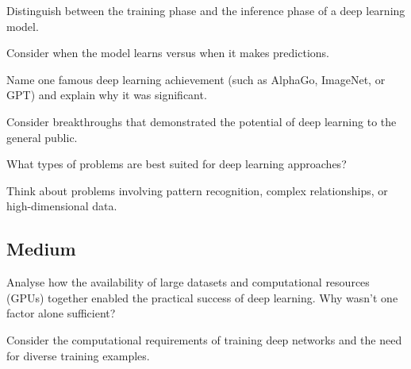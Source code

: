 \begin{exercisebox}[easy]
\begin{problem}
Distinguish between the training phase and the inference phase of a deep learning model.
\end{problem}
\begin{hintbox}
Consider when the model learns versus when it makes predictions.
\end{hintbox}
\end{exercisebox}


\begin{exercisebox}[easy]
\begin{problem}
Name one famous deep learning achievement (such as AlphaGo, ImageNet, or GPT) and explain why it was significant.
\end{problem}
\begin{hintbox}
Consider breakthroughs that demonstrated the potential of deep learning to the general public.
\end{hintbox}
\end{exercisebox}


\begin{exercisebox}[easy]
\begin{problem}
What types of problems are best suited for deep learning approaches?
\end{problem}
\begin{hintbox}
Think about problems involving pattern recognition, complex relationships, or high-dimensional data.
\end{hintbox}
\end{exercisebox}


\subsection*{Medium}

\begin{exercisebox}[medium]
\begin{problem}
Analyse how the availability of large datasets and computational resources (GPUs) together enabled the practical success of deep learning. Why wasn't one factor alone sufficient?
\end{problem}
\begin{hintbox}
Consider the computational requirements of training deep networks and the need for diverse training examples.
\end{hintbox}
\end{exercisebox}



